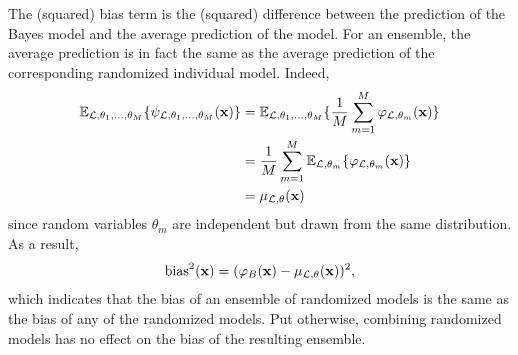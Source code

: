 The (squared) bias term is the (squared) difference between the prediction of the Bayes model
and the average prediction of the model. For an ensemble, the average prediction
is in fact the same as the average prediction of the corresponding randomized individual model. Indeed,
\begin{align}
\mathbb{E}_{{\cal L},\theta_1,\dots,\theta_M} \{ \psi_{{\cal L},\theta_1,\dots,\theta_M}(\mathbf{x}) \} &= \mathbb{E}_{{\cal L},\theta_1,\dots,\theta_M} \{ \frac{1}{M} \sum_{m=1}^M \varphi_{{\cal L},\theta_m}(\mathbf{x}) \} \nonumber \\
&= \frac{1}{M} \sum_{m=1}^M \mathbb{E}_{{\cal L},\theta_m} \{ \varphi_{{\cal L},\theta_m}(\mathbf{x}) \} \nonumber \\
&= \mu_{{\cal L},\theta}(\mathbf{x})
\end{align}
since random variables $\theta_m$ are independent but drawn from the
same distribution. As a result,
\begin{equation}
\text{bias}^2(\mathbf{x}) = (\varphi_B(\mathbf{x}) - \mu_{{\cal L},\theta}(\mathbf{x}))^2,
\end{equation}
which indicates that the bias of an ensemble of randomized models is the same
as the bias of any of the randomized models. Put otherwise, combining
randomized models has no effect on the bias of the resulting ensemble.

